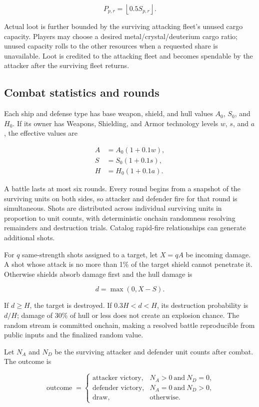 \documentclass[11pt]{article}
\begin{document}
\[
P_{p,r}=\left\lfloor 0.5S_{p,r}\right\rfloor.
\]

Actual loot is further bounded by the surviving attacking fleet's unused cargo capacity. Players may choose a desired metal/crystal/deuterium cargo ratio; unused capacity rolls to the other resources when a requested share is unavailable. Loot is credited to the attacking fleet and becomes spendable by the attacker after the surviving fleet returns.

\subsection{Combat statistics and rounds}

Each ship and defense type has base weapon, shield, and hull values $A_0$, $S_0$, and $H_0$. If its owner has Weapons, Shielding, and Armor technology levels $w$, $s$, and $a$, the effective values are

\begin{align}
A &= A_0(1+0.1w),\\
S &= S_0(1+0.1s),\\
H &= H_0(1+0.1a).
\end{align}

A battle lasts at most six rounds. Every round begins from a snapshot of the surviving units on both sides, so attacker and defender fire for that round is simultaneous. Shots are distributed across individual surviving units in proportion to unit counts, with deterministic onchain randomness resolving remainders and destruction trials. Catalog rapid-fire relationships can generate additional shots.

For $q$ same-strength shots assigned to a target, let $X=qA$ be incoming damage. A shot whose attack is no more than 1\% of the target shield cannot penetrate it. Otherwise shields absorb damage first and the hull damage is

\[
d=\max(0,X-S).
\]

If $d\ge H$, the target is destroyed. If $0.3H<d<H$, its destruction probability is $d/H$; damage of 30\% of hull or less does not create an explosion chance. The random stream is committed onchain, making a resolved battle reproducible from public inputs and the finalized random value.

Let $N_A$ and $N_D$ be the surviving attacker and defender unit counts after combat. The outcome is

\[
\operatorname{outcome}=
\begin{cases}
\text{attacker victory}, & N_A>0\ \text{and}\ N_D=0,\\
\text{defender victory}, & N_A=0\ \text{and}\ N_D>0,\\
\text{draw}, & \text{otherwise}.
\end{cases}
\]
\end{document}
